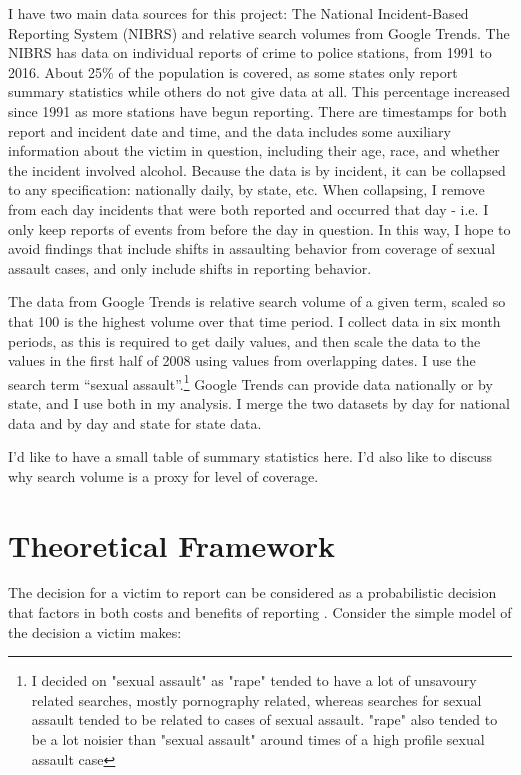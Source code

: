\documentclass[AER,draftmode]{AEA}
\begin{document}
I have two main data sources for this project: The National Incident-Based Reporting System (NIBRS) and relative search volumes from Google Trends. The NIBRS has data on individual reports of crime to police stations, from 1991 to 2016. About 25\% of the population is covered, as some states only report summary statistics while others do not give data at all. This percentage increased since 1991 as more stations have begun reporting. There are timestamps for both report and incident date and time, and the data includes some auxiliary information about the victim in question, including their age, race, and whether the incident involved alcohol. Because the data is by incident, it can be collapsed to any specification: nationally daily, by state, etc. When collapsing, I remove from each day incidents that were both reported and occurred that day - i.e. I only keep reports of events from before the day in question. In this way, I hope to avoid findings that include shifts in assaulting behavior from coverage of sexual assault cases, and only include shifts in reporting behavior. 

The data from Google Trends is relative search volume of a given term, scaled so that 100 is the highest volume over that time period. I collect data in six month periods, as this is required to get daily values, and then scale the data to the values in the first half of 2008 using values from overlapping dates. I use the search term “sexual assault”.\footnote{I decided on "sexual assault" as "rape" tended to have a lot of unsavoury related searches, mostly pornography related, whereas searches for sexual assault tended to be related to cases of sexual assault. "rape" also tended to be a lot noisier than "sexual assault" around times of a high profile sexual assault case} Google Trends can provide data nationally or by state, and I use both in my analysis. I merge the two datasets by day for national data and by day and state for state data.

I'd like to have a small table of summary statistics here. I'd also like to discuss why search volume is a proxy for level of coverage.

\section{Theoretical Framework}

The decision for a victim to report can be considered as a probabilistic decision that factors in both costs and benefits of reporting \cite{allen_reporting_2007}. Consider the simple model of the decision a victim makes:
\end{document}
